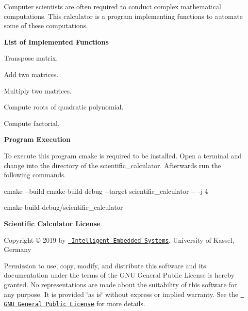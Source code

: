 Computer scientists are often required to conduct complex mathematical computations. This calculator is a program implementing functions to automate some of these computations.

{\bfseries{List of Implemented Functions}}


\begin{DoxyItemize}
\item Transpose matrix.
\item Add two matrices.
\item Multiply two matrices.
\item Compute roots of quadratic polynomial.
\item Compute factorial.
\end{DoxyItemize}

{\bfseries{Program Execution}}

To execute this program cmake is required to be installed. Open a terminal and change into the directory of the {\ttfamily scientific\+\_\+calculator}. Afterwards run the following commands.

{\ttfamily cmake -\/-\/build cmake-\/build-\/debug -\/-\/target scientific\+\_\+calculator -\/-\/ -\/j 4}

{\ttfamily cmake-\/build-\/debug/scientific\+\_\+calculator}

{\bfseries{Scientific Calculator License}}

Copyright \copyright{} 2019 by \href{https://www.uni-kassel.de/eecs/en/faculties/ies/home.html}{\texttt{ Intelligent Embedded Systems}}, University of Kassel, Germany

Permission to use, copy, modify, and distribute this software and its documentation under the terms of the G\+NU General Public License is hereby granted. No representations are made about the suitability of this software for any purpose. It is provided \char`\"{}as is\char`\"{} without express or implied warranty. See the \href{http://www.gnu.org/licenses/old-licenses/gpl-2.0.html}{\texttt{ G\+NU General Public License}} for more details. 